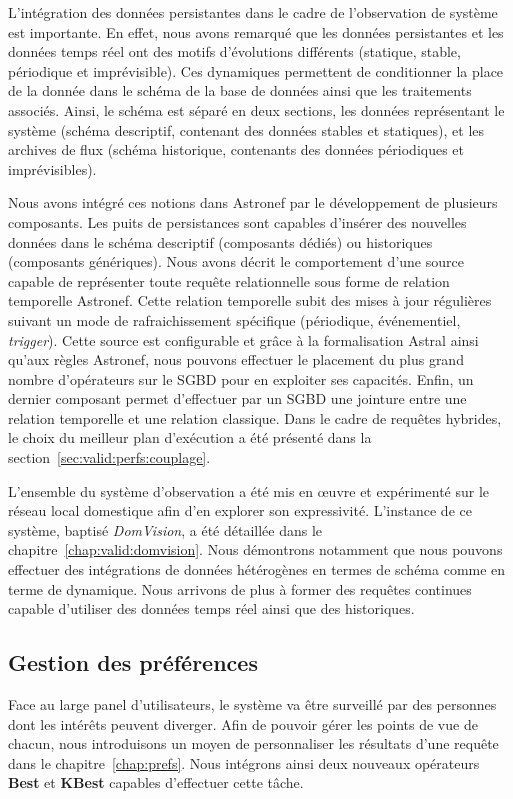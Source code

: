 L'intégration des données persistantes dans le cadre de l'observation de système est importante. En effet, nous avons remarqué que les données persistantes et les données temps réel ont des motifs d'évolutions différents (statique, stable, périodique et imprévisible). Ces dynamiques permettent de conditionner la place de la donnée dans le schéma de la base de données ainsi que les traitements associés. Ainsi, le schéma est séparé en deux sections, les données représentant le système (schéma descriptif, contenant des données stables et statiques), et les archives de flux (schéma historique, contenants des données périodiques et imprévisibles).

Nous avons intégré ces notions dans Astronef par le développement de plusieurs composants. Les puits de persistances sont capables d'insérer des nouvelles données dans le schéma descriptif (composants dédiés) ou historiques (composants génériques). Nous avons décrit le comportement d'une source capable de représenter toute requête relationnelle sous forme de relation temporelle Astronef. Cette relation temporelle subit des mises à jour régulières suivant un mode de rafraichissement spécifique (périodique, événementiel, \textit{trigger}). Cette source est configurable et grâce à la formalisation Astral ainsi qu'aux règles Astronef, nous pouvons effectuer le placement du plus grand nombre d'opérateurs sur le SGBD pour en exploiter ses capacités. Enfin, un dernier composant permet d'effectuer par un SGBD une jointure entre une relation temporelle et une relation classique. Dans le cadre de requêtes hybrides, le choix du meilleur plan d'exécution a été présenté dans la section~\ref{sec:valid:perfs:couplage}.

L'ensemble du système d'observation a été mis en œuvre et expérimenté sur le réseau local domestique afin d'en explorer son expressivité. L'instance de ce système, baptisé \textit{DomVision}, a été détaillée dans le chapitre~\ref{chap:valid:domvision}. Nous démontrons notamment que nous pouvons effectuer des intégrations de données hétérogènes en termes de schéma comme en terme de dynamique. Nous arrivons de plus à former des requêtes continues capable d'utiliser des données temps réel ainsi que des historiques.

\subsection{Gestion des préférences}
Face au large panel d'utilisateurs, le système va être surveillé par des personnes dont les intérêts peuvent diverger. Afin de pouvoir gérer les points de vue de chacun, nous introduisons un moyen de personnaliser les résultats d'une requête dans le chapitre~\ref{chap:prefs}. Nous intégrons ainsi deux nouveaux opérateurs \textbf{Best} et \textbf{KBest} capables d'effectuer cette tâche.

